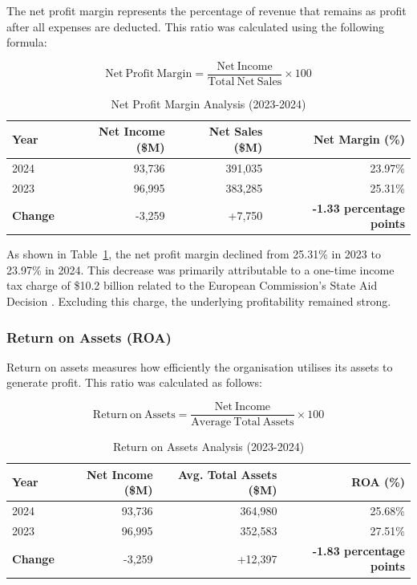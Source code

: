 \documentclass[12pt,a4paper]{article}
\begin{document}
The net profit margin represents the percentage of revenue that remains as profit after all expenses are deducted. This ratio was calculated using the following formula:

\begin{equation}
\mathrm{Net\ Profit\ Margin} = \frac{\mathrm{Net\ Income}}{\mathrm{Total\ Net\ Sales}} \times 100
\end{equation}

\begin{table}[H]
\centering
\caption{Net Profit Margin Analysis (2023-2024)}
\label{tab:net_margin}
\begin{tabular}{lrrr}
\toprule
\textbf{Year} & \textbf{Net Income (\$M)} & \textbf{Net Sales (\$M)} & \textbf{Net Margin (\%)} \\
\midrule
2024 & 93,736 & 391,035 & 23.97\% \\
2023 & 96,995 & 383,285 & 25.31\% \\
\textbf{Change} & -3,259 & +7,750 & \textbf{-1.33 percentage points} \\
\bottomrule
\end{tabular}
\end{table}

As shown in Table~\ref{tab:net_margin}, the net profit margin declined from 25.31\% in 2023 to 23.97\% in 2024. This decrease was primarily attributable to a one-time income tax charge of \$10.2 billion related to the European Commission's State Aid Decision \citep{apple202410k}. Excluding this charge, the underlying profitability remained strong.

\subsubsection{Return on Assets (ROA)}

Return on assets measures how efficiently the organisation utilises its assets to generate profit. This ratio was calculated as follows:

\begin{equation}
\mathrm{Return\ on\ Assets} = \frac{\mathrm{Net\ Income}}{\mathrm{Average\ Total\ Assets}} \times 100
\end{equation}

\begin{table}[H]
\centering
\caption{Return on Assets Analysis (2023-2024)}
\label{tab:roa}
\begin{tabular}{lrrr}
\toprule
\textbf{Year} & \textbf{Net Income (\$M)} & \textbf{Avg. Total Assets (\$M)} & \textbf{ROA (\%)} \\
\midrule
2024 & 93,736 & 364,980 & 25.68\% \\
2023 & 96,995 & 352,583 & 27.51\% \\
\textbf{Change} & -3,259 & +12,397 & \textbf{-1.83 percentage points} \\
\bottomrule
\end{tabular}
\end{table}
\end{document}
